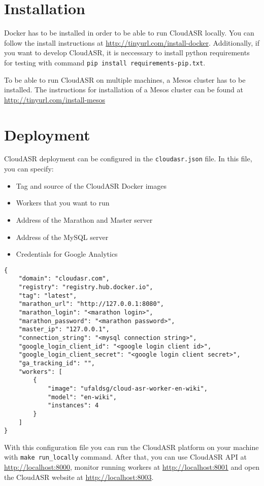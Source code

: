 \section{Installation}
Docker has to be installed in order to be able to run CloudASR locally.
You can follow the install instructions at \url{http://tinyurl.com/install-docker}.
Additionally, if you want to develop CloudASR, it is neccessary to install python requirements for testing with command \texttt{pip install requirements-pip.txt}.

To be able to run CloudASR on multiple machines, a Mesos cluster has to be installed.
The instructions for installation of a Mesos cluster can be found at \url{http://tinyurl.com/install-mesos}


\section{Deployment}
CloudASR deployment can be configured in the \texttt{cloudasr.json} file.
In this file, you can specify:

\begin{itemize}
    \item Tag and source of the CloudASR Docker images
    \item Workers that you want to run
    \item Address of the Marathon and Master server
    \item Address of the MySQL server
    \item Credentials for Google Analytics
\end{itemize}


\begin{verbatim}{
    "domain": "cloudasr.com",
    "registry": "registry.hub.docker.io",
    "tag": "latest",
    "marathon_url": "http://127.0.0.1:8080",
    "marathon_login": "<marathon login>",
    "marathon_password": "<marathon password>",
    "master_ip": "127.0.0.1",
    "connection_string": "<mysql connection string>",
    "google_login_client_id": "<google login client id>",
    "google_login_client_secret": "<google login client secret>",
    "ga_tracking_id": "",
    "workers": [
        {
            "image": "ufaldsg/cloud-asr-worker-en-wiki",
            "model": "en-wiki",
            "instances": 4
        }
    ]
}\end{verbatim}

With this configuration file you can run the CloudASR platform on your machine with \texttt{make run\_locally} command.
After that, you can use CloudASR API at \url{http://localhost:8000},
  monitor running workers at \url{http://localhost:8001}
  and open the CloudASR website at \url{http://localhost:8003}.

